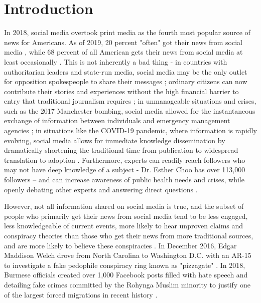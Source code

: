 \documentclass[NETN,manuscript]{stjour-new}
\begin{document}
\section{Introduction}
In 2018, social media overtook print media as the fourth most popular source of news for Americans. As of 2019, 20 percent "often" got their news from social media \citep{shearer2018social}, while 68 percent of all American gets their news from social media at least occasionally \citep{matsa2018news}. This is not inherently a bad thing - in countries with authoritarian leaders and state-run media, social media may be the only outlet for opposition spokespeople to share their messages \citep{walker2014breaking}; ordinary citizens can now contribute their stories and experiences without the high financial barrier to entry that traditional journalism requires \citep{qualman2012socialnomics, tapscott2008wikinomics}; in unmanageable situations and crises, such as the 2017 Manchester bombing, social media allowed for the instantaneous exchange of information between individuals and emergency management agencies \citep{mirbabaie2020breaking, eriksson2016facebook}; in situations like the COVID-19 pandemic, where information is rapidly evolving, social media allows for immediate knowledge dissemination by dramatically shortening the traditional time from publication to widespread translation to adoption \citep{chan2020social}. Furthermore, experts can readily reach followers who may not have deep knowledge of a subject - Dr. Esther Choo has over 113,000 followers – and can increase awareness of public health needs and crises, while openly debating other experts and answering direct questions \citep{gottlieb2020information}.

However, not all information shared on social media is true, and the subset of people who primarily get their news from social media tend to be less engaged, less knowledgeable of current events, more likely to hear unproven claims and conspiracy theories than those who get their news from more traditional sources, and are more likely to believe these conspiracies \citep{mitchell2020americans}. In December 2016, Edgar Maddison Welch drove from North Carolina to Washington D.C. with an AR-15 to investigate a fake pedophile conspiracy ring known as "pizzagate" \citep{goldman2016comet}. In 2018, Burmese officials created over 1,000 Facebook posts filled with hate speech and detailing fake crimes committed by the Rohynga Muslim minority to justify one of the largest forced migrations in recent history \citep{subedar2018country}.
\end{document}
